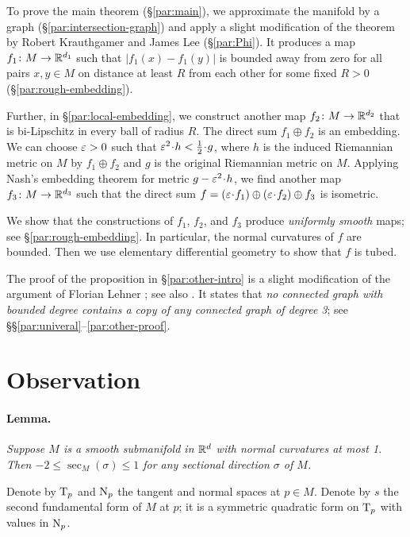 \documentclass[a4paper,10pt]{article}
\begin{document}
To prove the main theorem (§\ref{par:main}), we approximate the manifold by a graph (§\ref{par:intersection-graph}) and apply a slight modification of 
the theorem by Robert Krauthgamer and James Lee \cite{krauthgamer-lee0,krauthgamer-lee1} (§\ref{par:Phi}).
It produces a map $f_1\colon M\to \mathbb{R}^{d_1}$ such that $|f_1(x)-f_1(y)|$ is bounded away from zero for all pairs $x,y\in M$ on distance at least $R$ from each other for some fixed $R>0$ (§\ref{par:rough-embedding}).

Further, in §\ref{par:local-embedding}, we construct another map $f_2\colon M\to \mathbb{R}^{d_2}$ that is bi-Lipschitz in every ball of radius $R$.
The direct sum $f_1\oplus f_2$ is an embedding.
We can choose $\varepsilon>0$ such that $\eps^2\cdot h<\tfrac12\cdot g$,
where $h$ is the induced Riemannian metric on $M$ by $f_1\oplus f_2$ and $g$ is the original Riemannian metric on $M$.
Applying Nash's embedding theorem for metric $g-\eps^2\cdot h$,
we find another map $f_3\colon M\to \mathbb{R}^{d_3}$ such that the direct sum $f=(\eps\cdot f_1)\oplus (\eps\cdot  f_2)\oplus f_3$ is isometric.

We show that the constructions of $f_1$, $f_2$, and $f_3$ produce \textit{uniformly smooth} maps; see  §\ref{par:rough-embedding}.
In particular, the normal curvatures of $f$ are bounded.
Then we use elementary differential geometry to show that $f$ is tubed. 

The proof of the proposition in §\ref{par:other-intro} is a slight modification of the argument of Florian Lehner \cite[1.2]{lehner}; see also \cite{462670}. 
It states that \textit{no connected graph with bounded degree contains a copy of any connected graph of degree 3}; see §§\ref{par:univeral}--\ref{par:other-proof}.

\section*{Observation}

\paragraph{Lemma.}\label{lem:gauss}
\textit{Suppose $M$ is a smooth submanifold in $\mathbb{R}^d$ with normal curvatures at most 1.
Then $-2\le \sec_M(\sigma)\le 1$ for any sectional direction $\sigma$ of $M$.}
\medskip

Denote by $\mathrm{T}_p$ and $\mathrm{N}_p$ the tangent and normal spaces at $p\in M$.
Denote by $s$ the second fundamental form of $M$ at $p$;
it is a symmetric quadratic form on $\mathrm{T}_p$ with values in $\mathrm{N}_p$.
\end{document}
